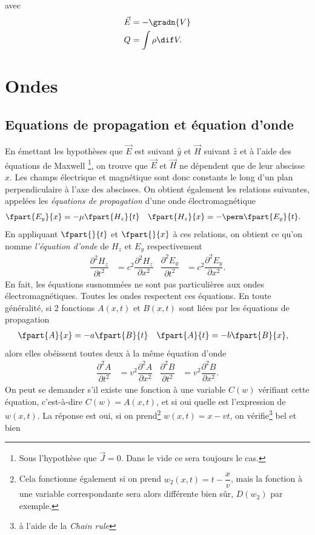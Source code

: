 avec
\begin{align*}
  \vec{E} & = -\gradn{V}\\
  Q & = \int \rho \dif V.
\end{align*}

\section{Ondes}

\subsection{Equations de propagation et équation d'onde}
En émettant les hypothèses que $\vec{E}$ est suivant $\hat{y}$ et $\vec{H}$ suivant $\hat{z}$ et à l'aide des équations de Maxwell
\footnote{Sous l'hypothèse que $\vec{J}=0$. Dans le vide ce sera toujours le cas.}, on trouve que $\vec{E}$ et $\vec{H}$ ne dépendent
que de leur abscisse $x$. Les champs électrique et magnétique sont donc constants le long d'un plan perpendiculaire à l'axe des abscisses. On obtient également les relations suivantes, appelées les \textit{équations de propagation} d'une onde électromagnétique\
\begin{align*}
\fpart{E_y}{x} &= -\mu \fpart{H_z}{t} & \fpart{H_z}{x} &= -\perm \fpart{E_y}{t}.
\end{align*}
En appliquant $\fpart{}{t}$ et $\fpart{}{x}$ à ces relations, on obtient ce qu'on nomme \textit{l'équation d'onde} de $H_z$ et $E_y$ respectivement
\begin{align*}
\dfrac{\partial^2 H_z}{\partial t^2} &=
c^2 \dfrac{\partial^2 H_z}{\partial x^2}
& \dfrac{\partial^2 E_y}{\partial t^2} &=
c^2 \dfrac{\partial^2 E_y}{\partial x^2}.
\end{align*}
En fait, les équations susnommées ne sont pas particulières aux ondes électromagnétiques. Toutes les ondes respectent ces équations. En toute généralité, si 2 fonctions $A(x,t)$ et $B(x,t)$ sont liées par les équations de propagation
\begin{align*}
\fpart{A}{x} &= - a \fpart{B}{t} & \fpart{A}{t} &= - b \fpart{B}{x},
\end{align*}
alors elles obéissent toutes deux à la même équation d'onde
\begin{align*}
\dfrac{\partial^2 A}{\partial t^2} &=
v^2 \dfrac{\partial^2 A}{\partial x^2}
& \dfrac{\partial^2 B}{\partial t^2} &=
v^2 \dfrac{\partial^2 B}{\partial x^2}.
\end{align*}
On peut se demander s'il existe une fonction à une variable $C(w)$ vérifiant cette équation, c'est-à-dire $C(w) = A(x,t)$, et si oui quelle est l'expression de $w(x,t)$. La réponse est oui, si on prend\footnote{Cela fonctionne également si on prend $w_2(x,t) = t-\dfrac{x}{v}$, mais la fonction à une variable correspondante sera alors différente bien sûr, $D(w_2)$ par exemple.} $w(x,t) = x - vt$, on vérifie\footnote{à l'aide de la \textit{Chain rule}} bel et bien
